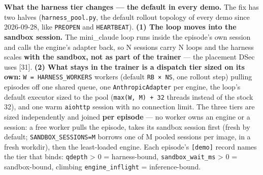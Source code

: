 \documentclass[
  paper=a4,
  ,captions=tableheading
]{scrartcl}
\begin{document}
\textbf{What the harness tier changes --- the default in every demo.}
The fix has two halves (\texttt{harness\_pool.py}, the default rollout
topology of every demo since 2026-09-28, like \texttt{PREOPEN} and
\texttt{HEARTBEAT}). \textbf{(1) The loop moves into the sandbox
session.} The mini\_claude loop runs inside the episode's own session
and calls the engine's adapter back, so N sessions carry N loops and the
harness scales \textbf{with the sandbox, not as part of the trainer} ---
the placement DSec uses {[}31{]}. \textbf{(2) What stays in the trainer
is a dispatch tier sized on its own:} \texttt{W\ =\ HARNESS\_WORKERS}
workers (default \texttt{RB\ ×\ NS}, one rollout step) pulling episodes
off one shared queue, one \texttt{AnthropicAdapter} per engine, the
loop's default executor sized to the pool (\texttt{max(W,\ M)\ +\ 32}
threads instead of the stock 32), and one warm \texttt{aiohttp} session
with no connection limit. The three tiers are sized independently and
joined \textbf{per episode} --- no worker owns an engine or a session: a
free worker pulls the episode, takes its sandbox session first (fresh by
default; \texttt{SANDBOX\_SESSIONS=M} borrows one of M pooled sessions
per image, in a fresh workdir), then the least-loaded engine. Each
episode's \texttt{{[}demo{]}} record names the tier that binds:
\texttt{qdepth} \textgreater{} 0 = harness-bound,
\texttt{sandbox\_wait\_ms} \textgreater{} 0 = sandbox-bound, climbing
\texttt{engine\_inflight} = inference-bound.
\end{document}
